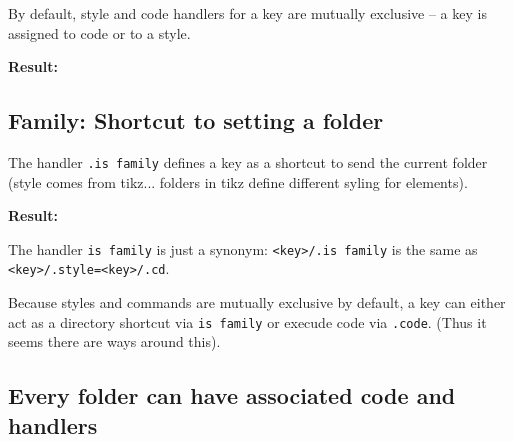 \documentclass{scrartcl}
\let\inlatex\lstinline
\newenvironment{result}
    {\noindent\ignorespaces\textbf{Result:}\newline}
    {\par\noindent\ignorespacesafterend}
\begin{document}
By default, style and code handlers for a key are mutually exclusive --
a key is assigned to code or to a style.

\begin{latex}

\end{latex}

\begin{result}

\end{result}


\subsection{Family: Shortcut to setting a folder}

The handler \inlatex{.is family} defines a key as a shortcut to send the current
folder (style comes from tikz... folders in tikz define different syling for 
elements).

\begin{latex}

\end{latex}

\begin{result}

\end{result}

The handler \inlatex{is family} is just a synonym:
\inlatex{<key>/.is family} is the same as \inlatex{<key>/.style=<key>/.cd}.

Because styles and commands are mutually exclusive by default,
a key can either act as a directory shortcut via \inlatex{is family} or 
execude code via \inlatex{.code}.
(Thus it seems there are ways around this).

\subsection{Every folder can have associated code and handlers}
\end{document}
